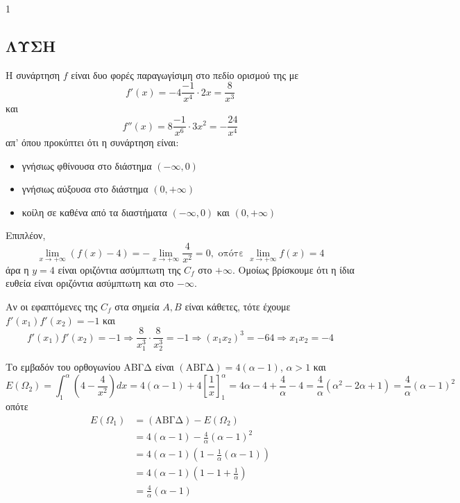 \begin{ylh}{1}
    \item [Ύλη από εικόνα]
\end{ylh}
\subsection*{\centering ΛΥΣΗ}
\begin{alist}
\item Η συνάρτηση $f$ είναι δυο φορές παραγωγίσιμη στο πεδίο ορισμού της με
    \[ f'(x) = -4 \frac{-1}{x^4} \cdot 2x = \frac{8}{x^3} \]
    και
    \[ f''(x) = 8 \frac{-1}{x^6} \cdot 3x^2 = -\frac{24}{x^4} \]
    απ' όπου προκύπτει ότι η συνάρτηση είναι:
    \begin{itemize}
        \item γνήσιως φθίνουσα στο διάστημα $(-\infty, 0)$
        \item γνήσιως αύξουσα στο διάστημα $(0, +\infty)$
        \item κοίλη σε καθένα από τα διαστήματα $(-\infty, 0)$ και $(0, +\infty)$
    \end{itemize}
    Επιπλέον,
    \[ \lim_{x \to +\infty} (f(x) - 4) = -\lim_{x \to +\infty} \frac{4}{x^2} = 0, \text{ οπότε } \lim_{x \to +\infty} f(x) = 4 \]
    άρα η $y=4$ είναι οριζόντια ασύμπτωτη της $C_f$ στο $+\infty$. Ομοίως βρίσκουμε ότι η ίδια ευθεία είναι οριζόντια ασύμπτωτη και στο $-\infty$. 

\item Αν οι εφαπτόμενες της $C_f$ στα σημεία $A, B$ είναι κάθετες, τότε έχουμε $f'(x_1)f'(x_2) = -1$ και
    \[ f'(x_1)f'(x_2) = -1 \Rightarrow \frac{8}{x_1^3} \cdot \frac{8}{x_2^3} = -1 \Rightarrow (x_1x_2)^3 = -64 \Rightarrow x_1x_2 = -4 \] 

\item \begin{rlist}
    \item Το εμβαδόν του ορθογωνίου ΑΒΓΔ είναι $(\text{ΑΒΓΔ})=4(\alpha-1)$, $\alpha > 1$ και
        \[ E(\Omega_2) = \int_1^\alpha \left(4 - \frac{4}{x^2}\right) dx = 4(\alpha-1) + 4 \left[\frac{1}{x}\right]_1^\alpha = 4\alpha - 4 + \frac{4}{\alpha} - 4 = \frac{4}{\alpha}(\alpha^2 - 2\alpha + 1) = \frac{4}{\alpha}(\alpha-1)^2 \]
        οπότε
        \begin{align*}
            E(\Omega_1) &= (\text{ΑΒΓΔ}) - E(\Omega_2) \\
            &= 4(\alpha-1) - \frac{4}{\alpha}(\alpha-1)^2 \\
            &= 4(\alpha-1) \left(1 - \frac{1}{\alpha}(\alpha-1)\right) \\
            &= 4(\alpha-1) \left(1 - 1 + \frac{1}{\alpha}\right) \\
            &= \frac{4}{\alpha}(\alpha-1)
        \end{align*}


\end{rlist}
\end{alist}

